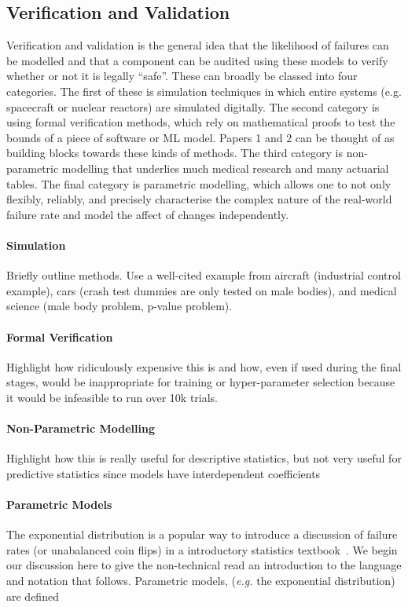 \subsection{Verification and Validation}
Verification and validation is the general idea that the likelihood of failures can be modelled and that a component can be audited using these models to verify whether or not it is legally ``safe''. 
These can broadly be classed into four categories. 
The first of these is simulation techniques in which entire systems (e.g. spacecraft or nuclear reactors) are simulated digitally. 
The second category is using formal verification methods, which rely on mathematical proofs to test the bounds of a piece of software or ML model. 
Papers 1 and 2 can be thought of as building blocks towards these kinds of methods.
The third category is non-parametric modelling that underlies much medical research and many actuarial tables.
The final category is parametric modelling, which allows one to not only flexibly, reliably, and precisely characterise the complex nature of the real-world failure rate and model the affect of changes independently. 
\paragraph{Simulation}
Briefly outline methods. Use a well-cited example from aircraft (industrial control example), cars (crash test dummies are only tested on male bodies), and medical science (male body problem, p-value problem).
\lipsum[1]
\paragraph{Formal Verification}
Highlight how ridiculously expensive this is and how, even if used during the final stages, would be inappropriate for training or hyper-parameter selection because it would be infeasible to run over 10k trials.
\lipsum[1]
\paragraph{Non-Parametric Modelling}
Highlight how this is really useful for descriptive statistics, but not very useful for predictive statistics since models have interdependent coefficients
\lipsum[1]
\paragraph{Parametric Models}
The exponential distribution is a popular way to introduce a discussion of failure rates (or unabalanced coin flips) in a introductory statistics textbook~\cite{}. 
We begin our discussion here to give the non-technical read an introduction to the language and notation that follows. 
Parametric models, (\textit{e.g.} the exponential distribution) are defined


